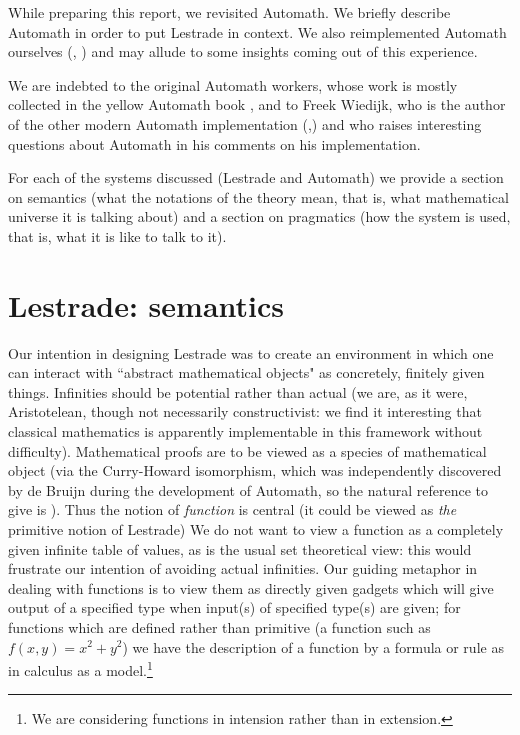 \documentclass[submission,copyright,creativecommons]{eptcs}
\begin{document}
While preparing this report, we revisited Automath.  We briefly describe Automath in order to put Lestrade in context.  We also reimplemented Automath ourselves (\cite{maniacsource}, \cite{maniacmanual}) and may allude to some insights coming out of this experience.

We are indebted to the original Automath workers, whose work is mostly collected in the yellow Automath book \cite{yellowbook}, and to Freek Wiedijk, who is the  author of the other modern Automath implementation (\cite{autmanual},\cite{autpaper}) and who raises  interesting questions about Automath in his comments on  his implementation.

For each of the systems discussed (Lestrade and Automath) we provide a section on semantics (what the notations of the theory mean, that is, what mathematical universe it is talking about) and a section on pragmatics (how the system is used, that is, what it is like to talk to it).

\section{Lestrade:  semantics}

 Our intention in designing Lestrade was to create an environment in which one can interact with ``abstract mathematical objects"  as concretely, finitely given things.  Infinities should be potential rather than actual (we are, as it were, Aristotelean, though not necessarily constructivist:  we find it interesting that classical mathematics is apparently implementable in this framework without difficulty).  Mathematical proofs are to be viewed as a species of mathematical object (via the Curry-Howard isomorphism, which was independently discovered by de Bruijn during the development of Automath, so the natural reference to give is \cite{debruijna2}).  Thus the notion of {\em function\/} is central (it could be viewed as {\em the\/} primitive notion of Lestrade)  We do not want to view a function as a completely given infinite table of values, as is the usual set theoretical view:  this would frustrate our intention of avoiding actual infinities.  Our guiding metaphor in dealing with functions is to view them as directly given gadgets which will give output of a specified type when input(s) of specified type(s) are given;  for functions which are defined rather than primitive (a function such as $f(x,y)=x^2+y^2$) we have the description of a function by a formula or rule as in calculus as a model.\footnote{We are considering functions in intension rather than in extension.}
\end{document}
